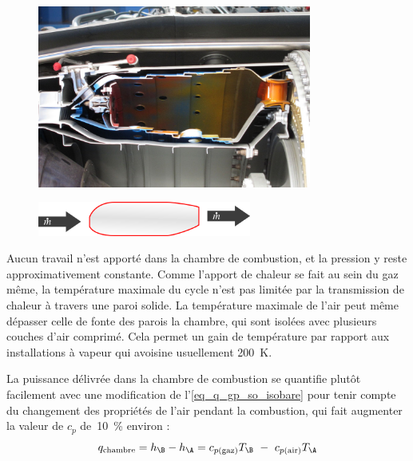 		\begin{figure}
			\begin{center}
				\includegraphics[width=9cm]{images/photo_chambre_combustion.jpg}
			\end{center}
			\label{fig_chambre_de_combustion1}
		\end{figure}

		\begin{figure}
			\begin{center}
				\includegraphics[width=7cm]{images/symbole_chambre_combustion.png}
			\end{center}
			\label{fig_chambre_de_combustion2}
		\end{figure}

		Aucun travail n’est apporté dans la chambre de combustion, et la pression y reste approximativement constante.	Comme l’apport de chaleur se fait au sein du gaz même, la température maximale du cycle n’est pas limitée par la transmission de chaleur à travers une paroi solide. La température maximale de l’air peut même dépasser celle de fonte des parois la chambre, qui sont isolées avec plusieurs couches d’air comprimé. Cela permet un gain de température par rapport aux installations à vapeur qui avoisine usuellement \SI{200}{\kelvin}.

		La puissance délivrée dans la chambre de combustion se quantifie plutôt facilement avec une modification de l’\cref{eq_q_gp_so_isobare} pour tenir compte du changement des propriétés de l’air pendant la combustion, qui fait augmenter la valeur de $c_p$ de~\SI{10}{\percent} environ :
		\begin{equation}
			q_\text{chambre} = h_\B - h_\A = c_{p \text{(gaz)}} T_\B \ - \ c_{p \text{(air)}} T_\A
		\end{equation}

